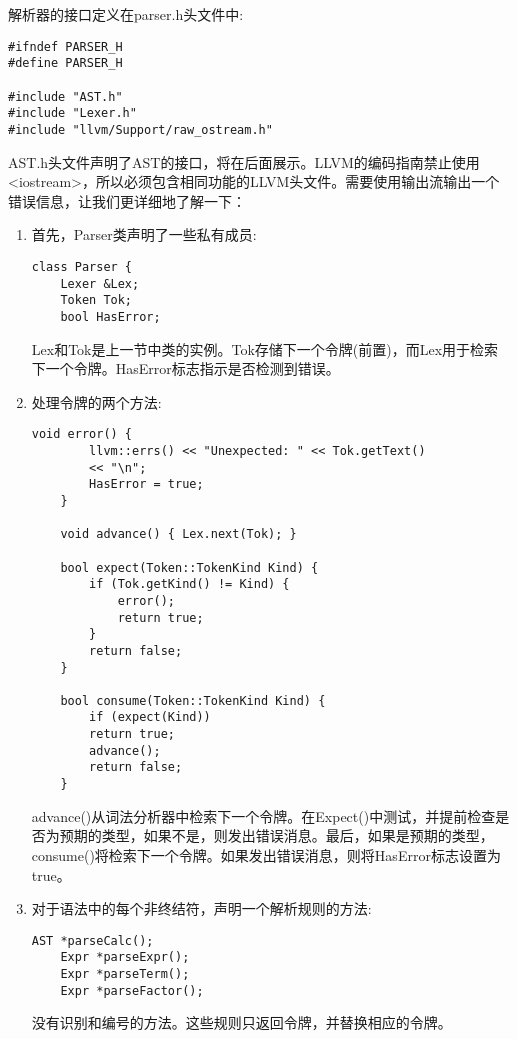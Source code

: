 解析器的接口定义在parser.h头文件中:\par

\begin{lstlisting}[caption={}]
#ifndef PARSER_H
#define PARSER_H

#include "AST.h"
#include "Lexer.h"
#include "llvm/Support/raw_ostream.h"
\end{lstlisting}

AST.h头文件声明了AST的接口，将在后面展示。LLVM的编码指南禁止使用<iostream>，所以必须包含相同功能的LLVM头文件。需要使用输出流输出一个错误信息，让我们更详细地了解一下：\par

\begin{enumerate}
\item 首先，Parser类声明了一些私有成员:
\begin{lstlisting}[caption={}]
class Parser {
	Lexer &Lex;
	Token Tok;
	bool HasError;
\end{lstlisting}
Lex和Tok是上一节中类的实例。Tok存储下一个令牌(前置)，而Lex用于检索下一个令牌。HasError标志指示是否检测到错误。

\item 处理令牌的两个方法:
\begin{lstlisting}[caption={}]
	void error() {
		llvm::errs() << "Unexpected: " << Tok.getText()
		<< "\n";
		HasError = true;
	}
	
	void advance() { Lex.next(Tok); }
	
	bool expect(Token::TokenKind Kind) {
		if (Tok.getKind() != Kind) {
			error();
			return true;
		}
		return false;
	}
	
	bool consume(Token::TokenKind Kind) {
		if (expect(Kind))
		return true;
		advance();
		return false;
	}
\end{lstlisting}
advance()从词法分析器中检索下一个令牌。在Expect()中测试，并提前检查是否为预期的类型，如果不是，则发出错误消息。最后，如果是预期的类型，consume()将检索下一个令牌。如果发出错误消息，则将HasError标志设置为true。\par

\item 对于语法中的每个非终结符，声明一个解析规则的方法:
\begin{lstlisting}[caption={}]
	AST *parseCalc();
	Expr *parseExpr();
	Expr *parseTerm();
	Expr *parseFactor();
\end{lstlisting}
\begin{tcolorbox}[colback=blue!5!white,colframe=blue!75!black, title=Note]
没有识别和编号的方法。这些规则只返回令牌，并替换相应的令牌。
\end{tcolorbox}


\end{enumerate}
